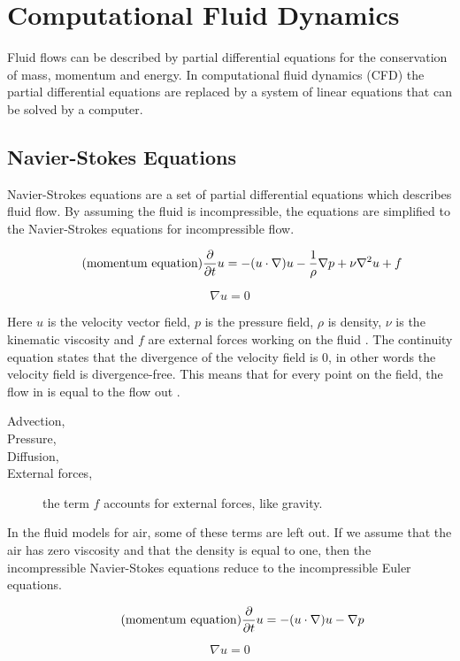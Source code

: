 \section{Computational Fluid Dynamics}

Fluid flows can be described by partial differential equations for the conservation 
of mass, momentum and energy. In computational fluid dynamics (CFD) the partial 
differential equations are replaced by a system of linear equations that can be 
solved by a computer. 

\subsection{Navier-Stokes Equations}

Navier-Strokes equations are a set of partial differential equations which describes 
fluid flow\cite{fluidDynamicsIntro}. By assuming the fluid is incompressible, 
the equations are simplified to the Navier-Strokes equations for incompressible 
flow\cite{originalSnowThesis}. 

\begin{equation} 
	\tag{momentum equation}
	\frac{\partial}{\partial t}u  = -(u \cdot \nabla)u - \frac{1}{\rho}\nabla p + \nu \nabla^2 u + f
\end{equation}

\begin{equation}
	\tag{continuity equation}
	\nabla u = 0
\end{equation}

Here $u$ is the velocity vector field, $p$ is the pressure field, $\rho$ is density,
$\nu$ is the kinematic viscosity and $f$ are external forces working on the fluid
\cite{gpuSnowThesis}. The continuity equation states that the divergence of the 
velocity field is 0, in other words the velocity field is divergence-free. This 
means that for every point on the field, the flow in is equal to the flow out
\cite{originalSnowThesis}. 

\begin{description}
	\item[Advection,]
	\item[Pressure,]
	\item[Diffusion,]
	\item[External forces,] the term $f$ accounts for external forces, like gravity.
\end{description}

In the fluid models for air, some of these terms are left out. If we assume that 
the air has zero viscosity and that the density is equal to one, then the 
incompressible Navier-Stokes equations reduce to the incompressible Euler 
equations. 

\begin{equation} 
	\tag{momentum equation}
	\frac{\partial}{\partial t}u  = -(u \cdot \nabla)u - \nabla p
\end{equation}

\begin{equation}
	\tag{continuity equation}
	\nabla u = 0
\end{equation}
